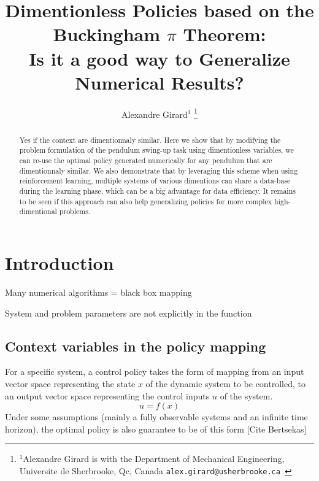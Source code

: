 

\title{\LARGE \bf
Dimentionless Policies based on the Buckingham $\pi$ Theorem: \\ 
Is it a good way to Generalize Numerical Results?
}


\author{Alexandre Girard$^{1}$%
\thanks{$^{1}$Alexandre Girard is with the Department of Mechanical Engineering, Universite de Sherbrooke, Qc, Canada {\tt\small  alex.girard@usherbrooke.ca }}%
}%


\maketitle
\thispagestyle{empty}
\pagestyle{empty}


\begin{abstract}
Yes if the context are dimentionnaly similar. Here we show that by modifying the problem formulation of the pendulum swing-up task using dimentionless variables, we can re-use the optimal policy generated numerically for any pendulum that are dimentionnaly similar. We also demonstrate that by leveraging this scheme when using reinforcement learning, multiple systems of various dimentions can share a data-base during the learning phase, which can be a big advantage for data efficiency. It remains to be seen if this approach can also help generalizing policies for more complex high-dimentional problems.
\end{abstract}

\section{Introduction}

Many numerical algorithms = black box mapping

System and problem parameters are not explicitly in the function




\subsection{Context variables in the policy mapping}

For a specific system, a control policy takes the form of mapping from an input vector space representing the state $x$ of the dynamic system to be controlled, to an output vector space representing the control inputs $u$ of the system. 
\begin{equation}
u
=
f \left(
x
\right)
\end{equation}
Under some assumptions (mainly a fully observable systems and an infinite time horizon), the optimal policy is also guarantee to be of this form [Cite Bertsekas]

